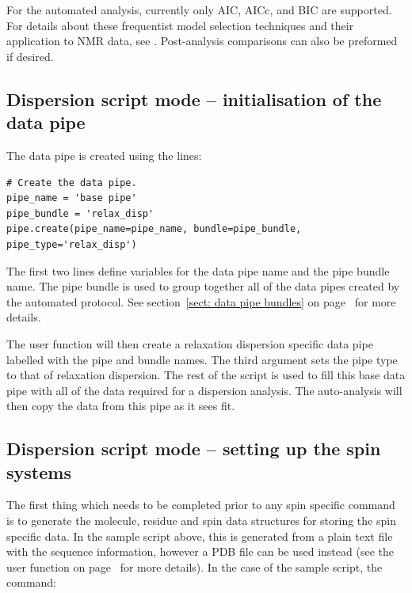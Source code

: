 For the automated analysis, currently only AIC, AICc, and BIC are supported.  For details about these frequentist model selection techniques and their application to NMR data, see \citet{dAuvergneGooley03}.  Post-analysis comparisons can also be preformed if desired.



\subsection{Dispersion script mode -- initialisation of the data pipe} \label{sect: dispersion initialisation}

The data pipe is created using the lines:

\begin{lstlisting}[firstnumber=30]
# Create the data pipe.
pipe_name = 'base pipe'
pipe_bundle = 'relax_disp'
pipe.create(pipe_name=pipe_name, bundle=pipe_bundle, pipe_type='relax_disp')
\end{lstlisting}

The first two lines define variables for the data pipe name and the pipe bundle name.  The pipe bundle is used to group together all of the data pipes created by the automated protocol.  See section~\ref{sect: data pipe bundles} on page~\pageref{sect: data pipe bundles} for more details.

The  user function will then create a relaxation dispersion specific data pipe labelled with the pipe and bundle names.  The third argument sets the pipe type to that of relaxation dispersion.  The rest of the script is used to fill this base data pipe with all of the data required for a dispersion analysis.  The auto-analysis will then copy the data from this pipe as it sees fit.



\subsection{Dispersion script mode -- setting up the spin systems}

The first thing which needs to be completed prior to any spin specific command is to generate the molecule, residue and spin data structures for storing the spin specific data.  In the sample script above, this is generated from a plain text file with the sequence information, however a PDB file can be used instead (see the  user function on page~\pageref{uf: structure.read_pdb} for more details).  In the case of the sample script, the command:

